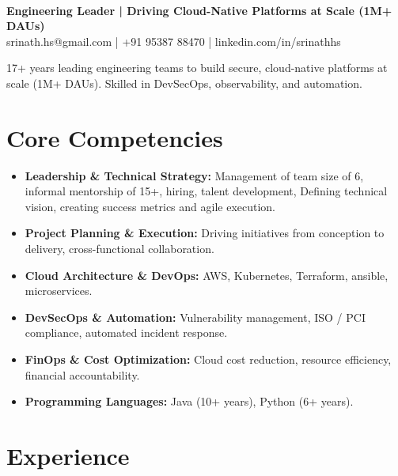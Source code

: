 \documentclass[11pt]{article}
\newcommand{\name}[1]{\noindent{\LARGE\sffamily\textbf{#1}}}
\begin{document}
\pagestyle{empty}
\color{bodytext}

\name{Srinath H S}\\[0.5em]
\textbf{Engineering Leader | Driving Cloud-Native Platforms at Scale (1M+ DAUs)
}\\[0.3em]
srinath.hs@gmail.com \quad | \quad +91 95387 88470 \quad | \quad linkedin.com/in/srinathhs

17+ years leading engineering teams to build secure, cloud-native platforms at scale (1M+ DAUs). Skilled in DevSecOps, observability, and automation.

\section*{Core Competencies}
\begin{itemize}[leftmargin=*, itemsep=-0.5em]
  \item \textbf{Leadership \& Technical Strategy:} Management of team size of 6, informal mentorship of 15+, hiring, talent development, Defining technical vision, creating success metrics and agile execution.
  \item \textbf{Project Planning \& Execution:} Driving initiatives from conception to delivery, cross-functional collaboration.
  \item \textbf{Cloud Architecture \& DevOps:} AWS, Kubernetes, Terraform, ansible, microservices.
  \item \textbf{DevSecOps \& Automation:} Vulnerability management, ISO / PCI compliance, automated incident response.
  \item \textbf{FinOps \& Cost Optimization:} Cloud cost reduction, resource efficiency, financial accountability.
  \item \textbf{Programming Languages:} Java (10+ years), Python (6+ years).
\end{itemize}

\section*{Experience}
\end{document}

